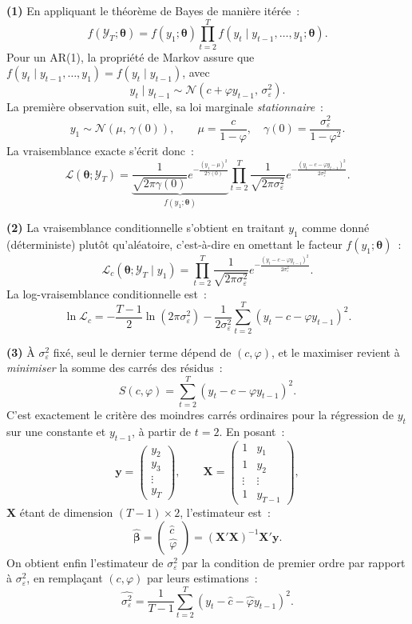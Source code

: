 \documentclass[11pt,a4paper,notitlepage]{article}
\newcommand{\question}[1]{\textbf{(#1)}}
\begin{document}
\question{1} En appliquant le théorème de Bayes de manière itérée~:
\[
f(\mathcal Y_T;\bm\theta) = f(y_1;\bm\theta)\prod_{t=2}^T
f(y_t \mid y_{t-1},\dots,y_1;\bm\theta).
\]
Pour un AR(1), la propriété de Markov assure que $f(y_t\mid
y_{t-1},\dots,y_1) = f(y_t\mid y_{t-1})$, avec
\[
y_t\mid y_{t-1} \sim \mathcal N\!\left(c+\varphi y_{t-1},\,
\sigma_{\varepsilon}^2\right).
\]
La première observation suit, elle, sa loi marginale
\emph{stationnaire}~:
\[
y_1 \sim \mathcal N\!\left(\mu,\,\gamma(0)\right),\qquad
\mu = \frac{c}{1-\varphi},\quad \gamma(0)=\frac{\sigma_{\varepsilon}^2}{1-\varphi^2}.
\]
La vraisemblance exacte s'écrit donc~:
\[
\mathcal L(\bm\theta;\mathcal Y_T) =
\underbrace{\frac{1}{\sqrt{2\pi\gamma(0)}}
e^{-\frac{(y_1-\mu)^2}{2\gamma(0)}}}_{f(y_1;\bm\theta)}
\prod_{t=2}^T \frac{1}{\sqrt{2\pi\sigma_{\varepsilon}^2}}
e^{-\frac{(y_t-c-\varphi y_{t-1})^2}{2\sigma_{\varepsilon}^2}}.
\]
\newline

\question{2} La vraisemblance conditionnelle s'obtient en traitant
$y_1$ comme donné (déterministe) plutôt qu'aléatoire, c'est-à-dire en
omettant le facteur $f(y_1;\bm\theta)$~:
\[
\mathcal L_c(\bm\theta;\mathcal Y_T\mid y_1) = \prod_{t=2}^T
\frac{1}{\sqrt{2\pi\sigma_{\varepsilon}^2}}
e^{-\frac{(y_t-c-\varphi y_{t-1})^2}{2\sigma_{\varepsilon}^2}}.
\]
La log-vraisemblance conditionnelle est~:
\[
\ln\mathcal L_c = -\frac{T-1}{2}\ln(2\pi\sigma_{\varepsilon}^2)
- \frac{1}{2\sigma_{\varepsilon}^2}\sum_{t=2}^T (y_t-c-\varphi y_{t-1})^2.
\]
\newline

\question{3} À $\sigma_{\varepsilon}^2$ fixé, seul le dernier terme
dépend de $(c,\varphi)$, et le maximiser revient à \emph{minimiser} la
somme des carrés des résidus~:
\[
S(c,\varphi) = \sum_{t=2}^T (y_t-c-\varphi y_{t-1})^2.
\]
C'est exactement le critère des moindres carrés ordinaires pour la
régression de $y_t$ sur une constante et $y_{t-1}$, à partir de
$t=2$. En posant~:
\[
\bm{y} = \begin{pmatrix} y_2 \\ y_3 \\ \vdots \\ y_T \end{pmatrix},\qquad
\bm{X} = \begin{pmatrix} 1 & y_1 \\ 1 & y_2 \\ \vdots & \vdots \\ 1 & y_{T-1} \end{pmatrix},
\]
$\bm X$ étant de dimension $(T-1)\times 2$, l'estimateur est~:
\[
\widehat{\bm\beta} = \begin{pmatrix}\hat c\\ \hat\varphi\end{pmatrix}
= (\bm X'\bm X)^{-1}\bm X'\bm y.
\]
On obtient enfin l'estimateur de $\sigma_{\varepsilon}^2$ par la
condition de premier ordre par rapport à $\sigma_{\varepsilon}^2$, en
remplaçant $(c,\varphi)$ par leurs estimations~:
\[
\widehat{\sigma_{\varepsilon}^2} = \frac{1}{T-1}\sum_{t=2}^T
\left(y_t-\hat c-\hat\varphi y_{t-1}\right)^2.
\]
\newline
\end{document}
